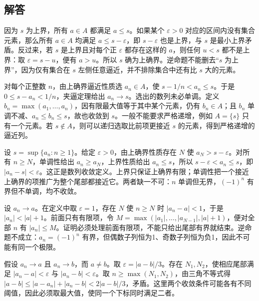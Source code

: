\documentclass[UTF8,12pt,a4paper,fontset=fandol]{ctexart}
\begin{document}
\subsection{解答}
\begin{solve}\label{ans:c2q1}
因为 $s$ 为上界，所有 $a\in A$ 都满足 $a\le s$。如果某个 $\varepsilon>0$ 对应的区间内没有集合元素，那么所有 $a\in A$ 均满足 $a\le s-\varepsilon$，即 $s-\varepsilon$ 也是上界，与 $s$ 是最小上界矛盾。反过来，若 $s$ 是上界且对每个正 $\varepsilon$ 都存在这样的 $a$，则任何 $u<s$ 都不是上界：取 $\varepsilon=s-u$，便有 $a>u$。所以 $s$ 确为上确界。逆命题不能删去“$s$ 为上界”，因为仅有集合在 $s$ 左侧任意逼近，并不排除集合中还有比 $s$ 大的元素。
\end{solve}

\begin{solve}\label{ans:c2q2}
对每个正整数 $n$，由上确界逼近性质选 $a_n\in A$，使 $s-1/n<a_n\le s$。于是 $0\le s-a_n<1/n$，夹逼定理给出 $a_n\to s$。选出的数列未必单调。定义 $b_n=\max(a_1,\ldots,a_n)$，因有限最大值等于其中某个元素，仍有 $b_n\in A$；且 $b_n$ 单调不减、$a_n\le b_n\le s$，故也收敛到 $s$。一般不能要求严格递增，例如 $A=\{s\}$ 只有一个元素。若 $s\notin A$，则可以递归选取比前项更接近 $s$ 的元素，得到严格递增的逼近列。
\end{solve}

\begin{solve}\label{ans:c2q3}
设 $s=\sup\{a_n:n\ge1\}$。给定 $\varepsilon>0$，由上确界性质存在 $N$ 使 $a_N>s-\varepsilon$。对所有 $n\ge N$，单调性给出 $a_n\ge a_N$，上界性质给出 $a_n\le s$，所以 $s-\varepsilon<a_n\le s$，即 $|a_n-s|<\varepsilon$。这正是数列收敛定义。上界只保证上确界有限；单调性把一个接近上确界的项推广为整个尾部都接近它。两者缺一不可：$n$ 单调但无界，$(-1)^n$ 有界但不单调，均不收敛。
\end{solve}

\begin{solve}\label{ans:c2q4}
设 $a_n\to a$。在定义中取 $\varepsilon=1$，存在 $N$ 使 $n\ge N$ 时 $|a_n-a|<1$，于是 $|a_n|<|a|+1$。前面只有有限项，令 $M=\max(|a_1|,\ldots,|a_{N-1}|,|a|+1)$，便对全部 $n$ 有 $|a_n|\le M$。证明必须处理前面有限项，不能只给出尾部有界就结束。逆命题不成立：$a_n=(-1)^n$ 有界，但偶数子列恒为1、奇数子列恒为负1，因此不可能有同一个极限。
\end{solve}

\begin{solve}\label{ans:c2q5}
假设 $a_n\to a$ 且 $a_n\to b$，而 $a\ne b$。取 $\varepsilon=|a-b|/3$。存在 $N_1,N_2$，使相应尾部满足 $|a_n-a|<\varepsilon$ 与 $|a_n-b|<\varepsilon$。取 $n\ge\max(N_1,N_2)$，由三角不等式得 $|a-b|\le|a-a_n|+|a_n-b|<2|a-b|/3$，矛盾。这里两个收敛条件可能各有不同阈值，因此必须取最大值，使同一个下标同时满足二者。
\end{solve}
\end{document}
